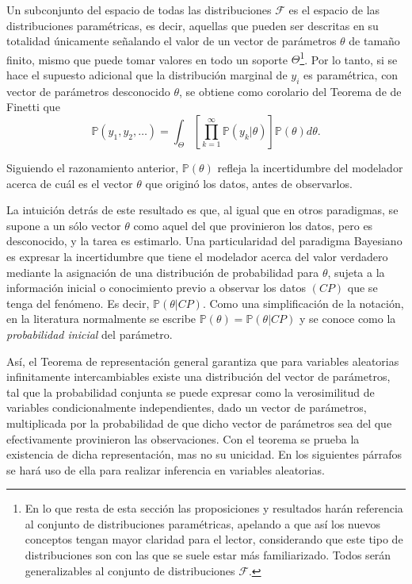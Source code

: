 Un subconjunto del espacio de todas las distribuciones $\mathcal{F}$ es el espacio de las distribuciones param\'etricas, es decir, aquellas que pueden ser descritas en su totalidad \'unicamente señalando el valor de un vector de par\'ametros $\theta$ de tamaño finito, mismo que puede tomar valores en todo un soporte $\Theta$\footnote{En lo que resta de esta secci\'on las proposiciones y resultados har\'an referencia al conjunto de distribuciones param\'etricas, apelando a que as\'i los nuevos conceptos tengan mayor claridad para el lector, considerando que este tipo de distribuciones son con las que se suele estar m\'as familiarizado. Todos ser\'an generalizables al conjunto de distribuciones $\mathcal{F}$.}. Por lo tanto, si se hace el supuesto adicional que la distribuci\'on marginal de $y_i$ es param\'etrica, con vector de par\'ametros desconocido $\theta$, se obtiene como corolario del Teorema de de Finetti que
\begin{equation*}
    \mathbb{P}(y_1,y_2,\ldots) =
    \int_{\Theta}\left[\prod_{k=1}^\infty \mathbb{P}(y_k|\theta)\right]\mathbb{P}(\theta)d\theta.
\end{equation*}

Siguiendo el razonamiento anterior, $\mathbb{P}(\theta)$ refleja la incertidumbre del modelador acerca de cu\'al es el vector $\theta$ que origin\'o los datos, antes de observarlos. 

La intuici\'on detr\'as de este resultado es que, al igual que en otros paradigmas, se supone a un s\'olo vector $\theta$ como aquel del que provinieron los datos, pero es desconocido, y la tarea es estimarlo. Una particularidad del paradigma Bayesiano es expresar la incertidumbre que tiene el modelador acerca del valor verdadero mediante la asignaci\'on de una distribuci\'on de probabilidad para $\theta$, sujeta a la informaci\'on inicial o conocimiento previo a observar los datos $(CP)$ que se tenga del fen\'omeno. Es decir, $\mathbb{P}(\theta|CP)$. Como una simplificaci\'on de la notaci\'on, en la literatura normalmente se escribe $\mathbb{P}(\theta) = \mathbb{P}(\theta|CP)$ y se conoce como la \textit{probabilidad inicial} del par\'ametro.

As\'i, el Teorema de representaci\'on general garantiza que para variables aleatorias infinitamente intercambiables existe una distribuci\'on del vector de par\'ametros, tal que la probabilidad conjunta se puede expresar como la verosimilitud de variables condicionalmente independientes, dado un vector de par\'ametros, multiplicada por la probabilidad de que dicho vector de par\'ametros sea del que efectivamente provinieron las observaciones. Con el teorema se prueba la existencia de dicha representaci\'on, mas no su unicidad. En los siguientes p\'arrafos se har\'a uso de ella para realizar inferencia en variables aleatorias.

